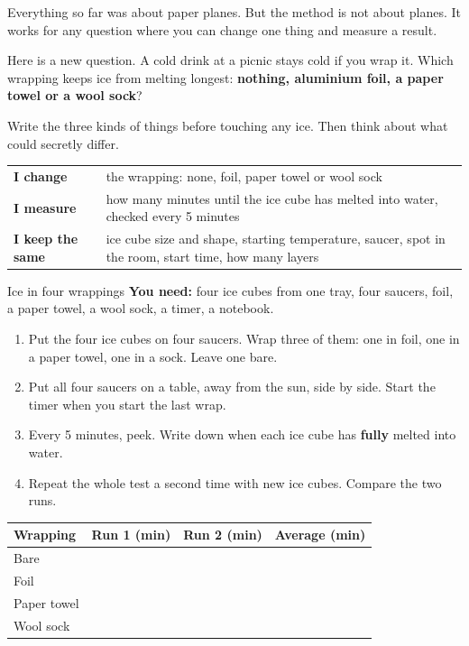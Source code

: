 \label{ch5}

Everything so far was about paper planes. But the method is not about planes. It works for any question where you can change one thing and measure a result.

Here is a new question. A cold drink at a picnic stays cold if you wrap it. Which wrapping keeps ice from melting longest: \textbf{nothing, aluminium foil, a paper towel or a wool sock}?

Write the three kinds of things before touching any ice. Then think about what could secretly differ.

\begin{center}
\sffamily\small\renewcommand{\arraystretch}{1.5}
\begin{tabular}{@{}p{3.4cm}p{7.6cm}@{}}
\toprule
\textbf{I change} & the wrapping: none, foil, paper towel or wool sock\\
\textbf{I measure} & how many minutes until the ice cube has melted into water, checked every 5 minutes\\
\textbf{I keep the same} & ice cube size and shape, starting temperature, saucer, spot in the room, start time, how many layers\\
\bottomrule
\end{tabular}
\end{center}

\begin{tryit}{Ice in four wrappings}
\textbf{You need:} four ice cubes from one tray, four saucers, foil, a paper towel, a wool sock, a timer, a notebook.
\begin{enumerate}[leftmargin=1.6em]
\item Put the four ice cubes on four saucers. Wrap three of them: one in foil, one in a paper towel, one in a sock. Leave one bare.
\item Put all four saucers on a table, away from the sun, side by side. Start the timer when you start the last wrap.
\item Every 5 minutes, peek. Write down when each ice cube has \textbf{fully} melted into water.
\item Repeat the whole test a second time with new ice cubes. Compare the two runs.
\end{enumerate}
\par\medskip
\renewcommand{\arraystretch}{1.6}
\begin{tabular}{|l|c|c|c|}
\hline
\textbf{Wrapping} & \textbf{Run 1 (min)} & \textbf{Run 2 (min)} & \textbf{Average (min)}\\ \hline
Bare & & & \\ \hline
Foil & & & \\ \hline
Paper towel & & & \\ \hline
Wool sock & & & \\ \hline
\end{tabular}
\end{tryit}

